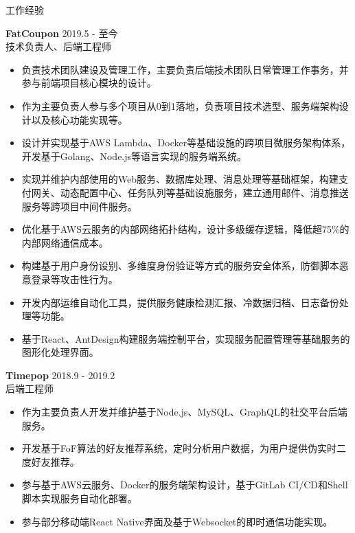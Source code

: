 \documentclass{resume} %
\begin{document}
\begin{rSection}{工作经验}

\textbf{FatCoupon} \hfill 2019.5 - 至今\\
技术负责人、后端工程师 \hfill \textit{}
\begin{itemize}
  \itemsep -3pt {}
  \item 负责技术团队建设及管理工作，主要负责后端技术团队日常管理工作事务，并参与前端项目核心模块的设计。
  \item 作为主要负责人参与多个项目从0到1落地，负责项目技术选型、服务端架构设计以及核心功能实现等。
  \item 设计并实现基于AWS Lambda、Docker等基础设施的跨项目微服务架构体系，开发基于Golang、Node.js等语言实现的服务端系统。
  \item 实现并维护内部使用的Web服务、数据库处理、消息处理等基础框架，构建支付网关、动态配置中心、任务队列等基础设施服务，建立通用邮件、消息推送服务等跨项目中间件服务。
  \item 优化基于AWS云服务的内部网络拓扑结构，设计多级缓存逻辑，降低超75\%的内部网络通信成本。
  \item 构建基于用户身份设别、多维度身份验证等方式的服务安全体系，防御脚本恶意登录等攻击性行为。
  \item 开发内部运维自动化工具，提供服务健康检测汇报、冷数据归档、日志备份处理等功能。
  \item 基于React、AntDesign构建服务端控制平台，实现服务配置管理等基础服务的图形化处理界面。
\end{itemize}

\textbf{Timepop} \hfill 2018.9 - 2019.2\\
后端工程师 \hfill \textit{}
\begin{itemize}
  \itemsep -3pt {}
  \item 作为主要负责人开发并维护基于Node.js、MySQL、GraphQL的社交平台后端服务。
  \item 开发基于FoF算法的好友推荐系统，定时分析用户数据，为用户提供伪实时二度好友推荐。
  \item 参与基于AWS云服务、Docker的服务端架构设计，基于GitLab CI/CD和Shell脚本实现服务自动化部署。
  \item 参与部分移动端React Native界面及基于Websocket的即时通信功能实现。
\end{itemize}


\end{rSection}
\end{document}
